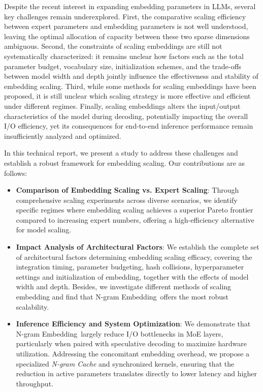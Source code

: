 \documentclass{article}
\newcommand{\method}{N-gram Embedding}
\begin{document}
Despite the recent interest in expanding embedding parameters in LLMs, several key challenges remain underexplored. First, the comparative scaling efficiency between expert parameters and embedding parameters is not well understood, leaving the optimal allocation of capacity between these two sparse dimensions ambiguous. Second, the constraints of scaling embeddings are still not systematically characterized: it remains unclear how factors such as the total parameter budget, vocabulary size, initialization schemes, and the trade-offs between model width and depth jointly influence the effectiveness and stability of embedding scaling. Third, while some methods for scaling embeddings have been proposed, it is still unclear which scaling strategy is more effective and efficient under different regimes. Finally, scaling embeddings alters the input/output characteristics of the model during decoding, potentially impacting the overall I/O efficiency, yet its consequences for end-to-end inference performance remain insufficiently analyzed and optimized.

In this technical report, we present a study to address these challenges and establish a robust framework for embedding scaling. Our contributions are as follows: 
\begin{itemize} 
\item \textbf{Comparison of Embedding Scaling vs. Expert Scaling}:
Through comprehensive scaling experiments across diverse scenarios, we identify specific regimes where embedding scaling achieves a superior Pareto frontier compared to increasing expert numbers, offering a high-efficiency alternative for model scaling.
\item \textbf{Impact Analysis of Architectural Factors}:
We establish the complete set of architectural factors determining embedding scaling efficacy, covering the integration timing, parameter budgeting, hash collisions, hyperparameter settings and initialization of embedding, together with the effects of model width and depth. %
Besides, we investigate different methods of scaling embedding and find that \method\ offers the most robust scalability.
\item \textbf{Inference Efficiency and System Optimization}: %
We demonstrate that \method\ largely reduce I/O bottlenecks in MoE layers, particularly when paired with speculative decoding to maximize hardware utilization. Addressing the concomitant embedding overhead, we propose a specialized \textit{N-gram Cache} and synchronized kernels, ensuring that the reduction in active parameters translates directly to lower latency and higher throughput.
\end{itemize}
\end{document}
